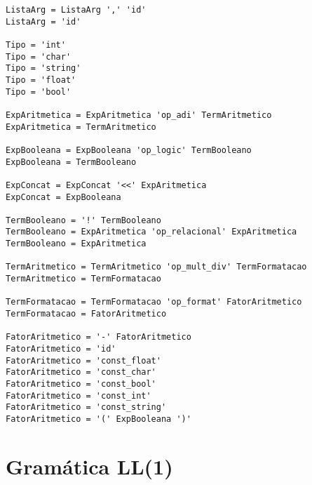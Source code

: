 \documentclass[
  12pt,				%
  oneside,			%
  a4paper,			%
  english,			%
  french,				%
  spanish,			%
  brazil,				%
]{abntex2}
\begin{document}
\begin{lstlisting}[label={code:gramatica-original},caption={Gramática
    original da linguagem de programação LisC.},style={mystyle}]
ListaArg = ListaArg ',' 'id'
ListaArg = 'id'

Tipo = 'int'
Tipo = 'char'
Tipo = 'string'
Tipo = 'float'
Tipo = 'bool'

ExpAritmetica = ExpAritmetica 'op_adi' TermAritmetico
ExpAritmetica = TermAritmetico

ExpBooleana = ExpBooleana 'op_logic' TermBooleano
ExpBooleana = TermBooleano

ExpConcat = ExpConcat '<<' ExpAritmetica
ExpConcat = ExpBooleana

TermBooleano = '!' TermBooleano
TermBooleano = ExpAritmetica 'op_relacional' ExpAritmetica
TermBooleano = ExpAritmetica

TermAritmetico = TermAritmetico 'op_mult_div' TermFormatacao
TermAritmetico = TermFormatacao

TermFormatacao = TermFormatacao 'op_format' FatorAritmetico
TermFormatacao = FatorAritmetico

FatorAritmetico = '-' FatorAritmetico
FatorAritmetico = 'id'
FatorAritmetico = 'const_float'
FatorAritmetico = 'const_char'
FatorAritmetico = 'const_bool'
FatorAritmetico = 'const_int'
FatorAritmetico = 'const_string'
FatorAritmetico = '(' ExpBooleana ')'

\end{lstlisting}

\chapter{Gramática LL(1)}
\label{cha:gramatica-ll1}
\end{document}
